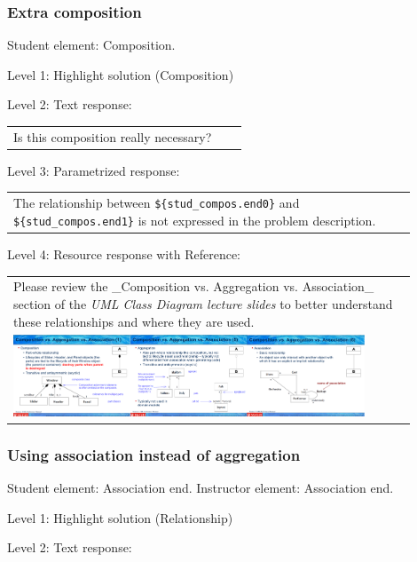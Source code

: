 \subsubsection{Extra composition}

Student element: Composition.  \medskip

\noindent Level 1: Highlight solution (Composition) \medskip

\noindent Level 2: Text response: \medskip

\begin{tabular}{|p{0.9\linewidth}}
Is this composition really necessary?
\end{tabular} \medskip

\noindent Level 3: Parametrized response: \medskip

\begin{tabular}{|p{0.9\linewidth}}
The relationship between \verb|${stud_compos.end0}| and \verb|${stud_compos.end1}| is not expressed in the problem description.
\end{tabular} \medskip

\noindent Level 4: Resource response with Reference: \medskip

\begin{tabular}{|p{0.9\linewidth}}
Please review the _Composition vs. Aggregation vs. Association_ section of 
the \textit{UML Class Diagram lecture slides} to 
better understand these relationships and where they are used.

\\
\includegraphics[width=0.9\textwidth]{images/composition_aggregation_association.png}
\end{tabular} \medskip


\subsubsection{Using association instead of aggregation}

Student element: Association end. Instructor element: Association end. \medskip

\noindent Level 1: Highlight solution (Relationship) \medskip

\noindent Level 2: Text response: \medskip

